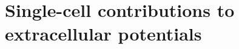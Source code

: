 \documentclass[preprint,11pt,authoryear]{elsarticle}
\newcommand{\hlb}[2][blue]{ {\sethlcolor{#1} \hl{#2}} }
\newcommand{\ghnote}[1]{\color{white}{\hlb{GH: #1 }}\color{black}}
\newcommand{\tvntxt}[1]{{\color{OliveGreen}#1}}
\begin{document}
%


\section{Single-cell contributions to extracellular potentials} \label{sec:ExtracellularPotentials}
\end{document}

